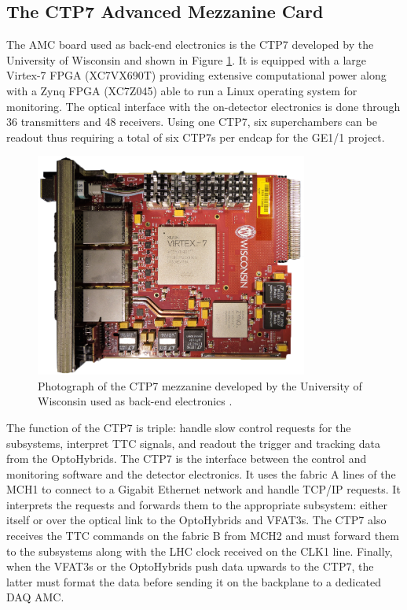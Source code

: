     \subsection{The CTP7 Advanced Mezzanine Card}

      The AMC board used as back-end electronics is the CTP7 \cite{CTP7} developed by the University of Wisconsin and shown in Figure \ref{fig:II-2-ctp7}. It is equipped with a large Virtex-7 FPGA (XC7VX690T) providing extensive computational power along with a Zynq FPGA (XC7Z045) able to run a Linux operating system for monitoring. The optical interface with the on-detector electronics is done through 36 transmitters and 48 receivers. Using one CTP7, six superchambers can be readout thus requiring a total of six CTP7s per endcap for the GE1/1 project. \\

      \begin{figure}[h!]
        \centering
        \includegraphics[width=0.8\textwidth]{img/II-2-daq/ctp7.png}
        \caption{Photograph of the CTP7 mezzanine developed by the University of Wisconsin used as back-end electronics \cite{CTP7}.}
        \label{fig:II-2-ctp7}
      \end{figure}

      The function of the CTP7 is triple: handle slow control requests for the subsystems, interpret TTC signals, and readout the trigger and tracking data from the OptoHybrids. The CTP7 is the interface between the control and monitoring software and the detector electronics. It uses the fabric A lines of the MCH1 to connect to a Gigabit Ethernet network and handle TCP/IP requests. It interprets the requests and forwards them to the appropriate subsystem: either itself or over the optical link to the OptoHybrids and VFAT3s. The CTP7 also receives the TTC commands on the fabric B from MCH2 and must forward them to the subsystems along with the LHC clock received on the CLK1 line. Finally, when the VFAT3s or the OptoHybrids push data upwards to the CTP7, the latter must format the data before sending it on the backplane to a dedicated DAQ AMC.

